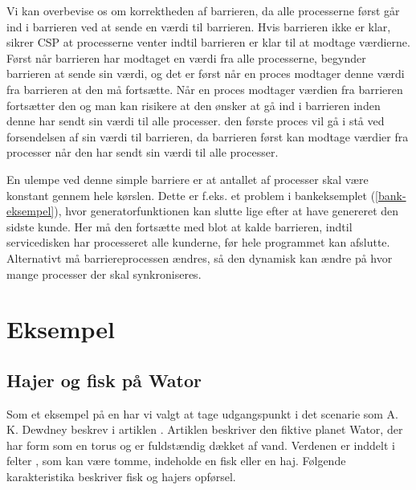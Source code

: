 Vi kan overbevise os om korrektheden af barrieren, da alle processerne først 
går ind i barrieren ved at sende en værdi til barrieren. Hvis barrieren ikke er 
klar, sikrer CSP at processerne venter indtil barrieren er klar til at modtage 
værdierne. Først når barrieren har modtaget en værdi fra alle processerne, 
begynder barrieren at sende sin værdi, og det er først når en proces modtager 
denne værdi fra barrieren at den må fortsætte. Når en proces modtager værdien 
fra barrieren fortsætter den og man kan risikere at den ønsker at gå ind i 
barrieren inden denne har sendt sin værdi til alle processer. den første proces 
vil gå i stå ved forsendelsen af sin værdi til barrieren, da barrieren først 
kan modtage værdier fra processer når den har sendt sin værdi til alle 
processer.

En ulempe ved denne simple barriere er at antallet af processer skal være 
konstant gennem hele kørslen.
Dette er f.eks. et problem i bankeksemplet (\cref{bank-eksempel}), hvor 
generatorfunktionen kan slutte lige efter at have genereret den sidste kunde.  
Her må den fortsætte med blot at kalde barrieren, indtil servicedisken har 
processeret alle kunderne, før hele programmet kan afslutte. Alternativt må 
barriereprocessen ændres, så den dynamisk kan ændre på hvor mange processer der 
skal synkroniseres. 


\section{Eksempel}


\subsection{Hajer og fisk på Wator} Som et eksempel på en \des har vi valgt at 
tage  udgangspunkt i det scenarie som A. K. Dewdney
beskrev i artiklen \cite{wator}. Artiklen beskriver den
fiktive planet Wator, der har form som en torus og er fuldstændig
dækket af vand. Verdenen er inddelt i felter \cite[20]{wator}, som kan være tomme, indeholde en
fisk eller en haj. Følgende karakteristika beskriver fisk og hajers
opførsel.

